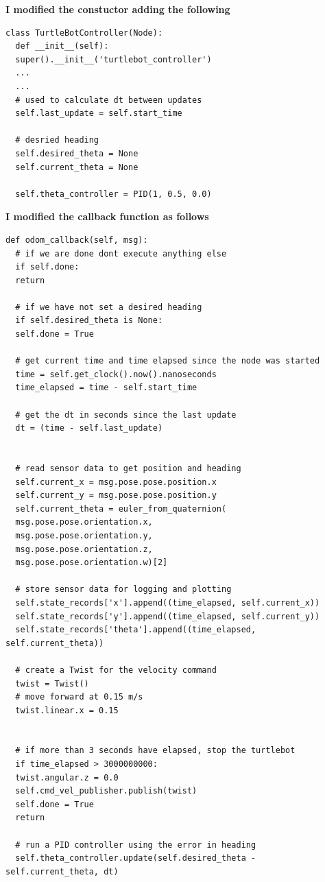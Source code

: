 \documentclass{article}
\begin{document}
\noindent \textbf{I modified the constuctor adding the following}

\begin{verbatim}
class TurtleBotController(Node):
  def __init__(self):
  super().__init__('turtlebot_controller')
  ...
  ...
  # used to calculate dt between updates
  self.last_update = self.start_time

  # desried heading
  self.desired_theta = None
  self.current_theta = None

  self.theta_controller = PID(1, 0.5, 0.0)
\end{verbatim}

\noindent \textbf{I modified the callback function as follows}

\begin{verbatim}
def odom_callback(self, msg):
  # if we are done dont execute anything else
  if self.done:
  return

  # if we have not set a desired heading 
  if self.desired_theta is None:
  self.done = True
  
  # get current time and time elapsed since the node was started
  time = self.get_clock().now().nanoseconds
  time_elapsed = time - self.start_time

  # get the dt in seconds since the last update
  dt = (time - self.last_update)
  

  # read sensor data to get position and heading
  self.current_x = msg.pose.pose.position.x
  self.current_y = msg.pose.pose.position.y
  self.current_theta = euler_from_quaternion(
  msg.pose.pose.orientation.x,
  msg.pose.pose.orientation.y, 
  msg.pose.pose.orientation.z,
  msg.pose.pose.orientation.w)[2]

  # store sensor data for logging and plotting
  self.state_records['x'].append((time_elapsed, self.current_x))
  self.state_records['y'].append((time_elapsed, self.current_y))
  self.state_records['theta'].append((time_elapsed, self.current_theta))

  # create a Twist for the velocity command
  twist = Twist()
  # move forward at 0.15 m/s
  twist.linear.x = 0.15


  # if more than 3 seconds have elapsed, stop the turtlebot
  if time_elapsed > 3000000000: 
  twist.angular.z = 0.0
  self.cmd_vel_publisher.publish(twist)
  self.done = True
  return
  
  # run a PID controller using the error in heading
  self.theta_controller.update(self.desired_theta - self.current_theta, dt)
  

\end{verbatim}
\end{document}
